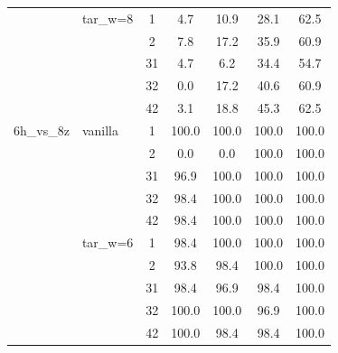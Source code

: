 \begin{table}[t]
\begin{tabular}{llccccc}
 & tar_w=8 & 1 & 4.7 & 10.9 & 28.1 & 62.5 \\
 &  & 2 & 7.8 & 17.2 & 35.9 & 60.9 \\
 &  & 31 & 4.7 & 6.2 & 34.4 & 54.7 \\
 &  & 32 & 0.0 & 17.2 & 40.6 & 60.9 \\
 &  & 42 & 3.1 & 18.8 & 45.3 & 62.5 \\
\midrule
6h_vs_8z & vanilla & 1 & 100.0 & 100.0 & 100.0 & 100.0 \\
 &  & 2 & 0.0 & 0.0 & 100.0 & 100.0 \\
 &  & 31 & 96.9 & 100.0 & 100.0 & 100.0 \\
 &  & 32 & 98.4 & 100.0 & 100.0 & 100.0 \\
 &  & 42 & 98.4 & 100.0 & 100.0 & 100.0 \\
 & tar_w=6 & 1 & 98.4 & 100.0 & 100.0 & 100.0 \\
 &  & 2 & 93.8 & 98.4 & 100.0 & 100.0 \\
 &  & 31 & 98.4 & 96.9 & 98.4 & 100.0 \\
 &  & 32 & 100.0 & 100.0 & 96.9 & 100.0 \\
 &  & 42 & 100.0 & 98.4 & 98.4 & 100.0 \\
\bottomrule
\end{tabular}
\end{table}